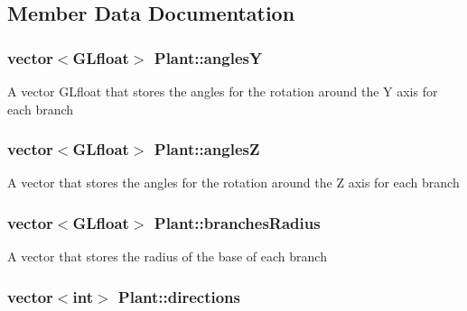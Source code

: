 \subsection{Member Data Documentation}
\hypertarget{class_plant_a16888c602067089a5aaa25ab6a92466f}{
\subsubsection[{angles\+Y}]{\setlength{\rightskip}{0pt plus 5cm}vector$<$G\+Lfloat$>$ Plant\+::angles\+Y\hspace{0.3cm}{\ttfamily [protected]}}}\label{class_plant_a16888c602067089a5aaa25ab6a92466f}
A vector G\+Lfloat that stores the angles for the rotation around the Y axis for each branch \hypertarget{class_plant_a298b462dbd0b350d08b5262990a2576b}{
\subsubsection[{angles\+Z}]{\setlength{\rightskip}{0pt plus 5cm}vector$<$G\+Lfloat$>$ Plant\+::angles\+Z\hspace{0.3cm}{\ttfamily [protected]}}}\label{class_plant_a298b462dbd0b350d08b5262990a2576b}
A vector that stores the angles for the rotation around the Z axis for each branch \hypertarget{class_plant_a4d8a4ea7bbede32b0f6ba1f3415d8f54}{
\subsubsection[{branches\+Radius}]{\setlength{\rightskip}{0pt plus 5cm}vector$<$G\+Lfloat$>$ Plant\+::branches\+Radius\hspace{0.3cm}{\ttfamily [protected]}}}\label{class_plant_a4d8a4ea7bbede32b0f6ba1f3415d8f54}
A vector that stores the radius of the base of each branch \hypertarget{class_plant_a3ec2334fa4c49998f74f62240eaf7537}{
\subsubsection[{directions}]{\setlength{\rightskip}{0pt plus 5cm}vector$<$int$>$ Plant\+::directions\hspace{0.3cm}{\ttfamily [protected]}}}\label{class_plant_a3ec2334fa4c49998f74f62240eaf7537}
